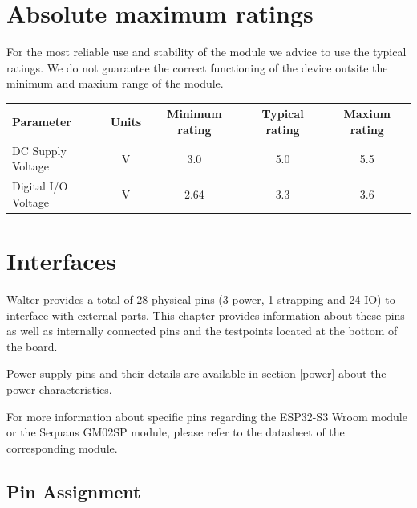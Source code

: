\documentclass[11pt]{article}
\begin{document}
\section{Absolute maximum ratings}
For the most reliable use and stability of the module we advice to use the typical ratings. We do not guarantee the correct functioning of the device outsite the minimum and maxium range of the module. 
\begin{center}
\renewcommand{\arraystretch}{1.5}
\begin{tabular}{|p{5cm}|c|c|c|c|}
\hline
{\bf Parameter} & {\bf Units} & {\bf Minimum rating} & {\bf Typical rating} & {\bf Maxium rating} \\
\hline
\hline
DC Supply Voltage & V & 3.0 & 5.0 & 5.5 \\
\hline
Digital I/O Voltage & V & 2.64 & 3.3 & 3.6 \\
\hline
\end{tabular}
\end{center}

\newpage
\section{Interfaces}
Walter provides a total of 28 physical pins (3 power, 1 strapping and 24 IO) to interface with external parts. This chapter provides information about these pins as well as internally connected pins and the testpoints located at the bottom of the board.\newline

Power supply pins and their details are available in section \ref{power} about the power characteristics.\newline

For more information about specific pins regarding the ESP32-S3 Wroom module or the Sequans GM02SP module, please refer to the datasheet of the corresponding module.

\subsection{Pin Assignment} \label{pin_assigment}
\end{document}
